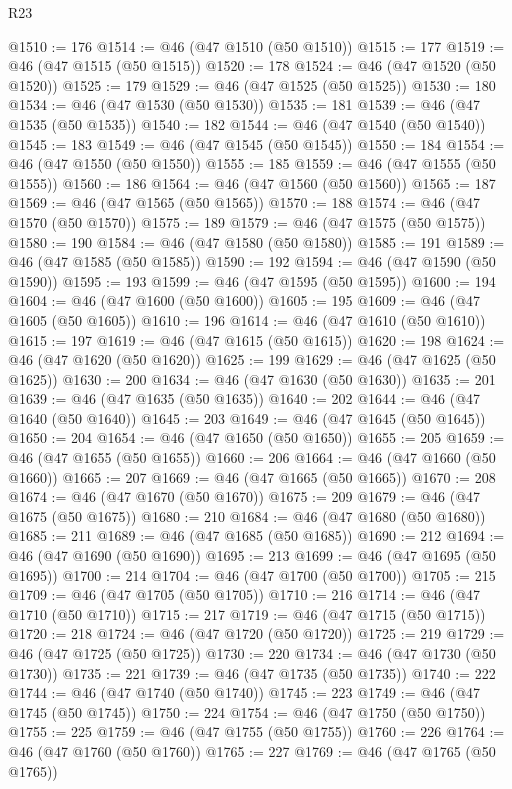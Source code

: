\begin{lexlean}{R23}
\begin{coremodule}
{{{{{{{{{{{{{{{{{{{{{@1510 := 176
@1514 := @46 (@47 @1510 (@50 @1510))
@1515 := 177
@1519 := @46 (@47 @1515 (@50 @1515))
@1520 := 178
@1524 := @46 (@47 @1520 (@50 @1520))
@1525 := 179
@1529 := @46 (@47 @1525 (@50 @1525))
@1530 := 180
@1534 := @46 (@47 @1530 (@50 @1530))
@1535 := 181
@1539 := @46 (@47 @1535 (@50 @1535))
@1540 := 182
@1544 := @46 (@47 @1540 (@50 @1540))
@1545 := 183
@1549 := @46 (@47 @1545 (@50 @1545))
@1550 := 184
@1554 := @46 (@47 @1550 (@50 @1550))
@1555 := 185
@1559 := @46 (@47 @1555 (@50 @1555))
@1560 := 186
@1564 := @46 (@47 @1560 (@50 @1560))
@1565 := 187
@1569 := @46 (@47 @1565 (@50 @1565))
@1570 := 188
@1574 := @46 (@47 @1570 (@50 @1570))
@1575 := 189
@1579 := @46 (@47 @1575 (@50 @1575))
@1580 := 190
@1584 := @46 (@47 @1580 (@50 @1580))
@1585 := 191
@1589 := @46 (@47 @1585 (@50 @1585))
@1590 := 192
@1594 := @46 (@47 @1590 (@50 @1590))
@1595 := 193
@1599 := @46 (@47 @1595 (@50 @1595))
@1600 := 194
@1604 := @46 (@47 @1600 (@50 @1600))
@1605 := 195
@1609 := @46 (@47 @1605 (@50 @1605))
@1610 := 196
@1614 := @46 (@47 @1610 (@50 @1610))
@1615 := 197
@1619 := @46 (@47 @1615 (@50 @1615))
@1620 := 198
@1624 := @46 (@47 @1620 (@50 @1620))
@1625 := 199
@1629 := @46 (@47 @1625 (@50 @1625))
@1630 := 200
@1634 := @46 (@47 @1630 (@50 @1630))
@1635 := 201
@1639 := @46 (@47 @1635 (@50 @1635))
@1640 := 202
@1644 := @46 (@47 @1640 (@50 @1640))
@1645 := 203
@1649 := @46 (@47 @1645 (@50 @1645))
@1650 := 204
@1654 := @46 (@47 @1650 (@50 @1650))
@1655 := 205
@1659 := @46 (@47 @1655 (@50 @1655))
@1660 := 206
@1664 := @46 (@47 @1660 (@50 @1660))
@1665 := 207
@1669 := @46 (@47 @1665 (@50 @1665))
@1670 := 208
@1674 := @46 (@47 @1670 (@50 @1670))
@1675 := 209
@1679 := @46 (@47 @1675 (@50 @1675))
@1680 := 210
@1684 := @46 (@47 @1680 (@50 @1680))
@1685 := 211
@1689 := @46 (@47 @1685 (@50 @1685))
@1690 := 212
@1694 := @46 (@47 @1690 (@50 @1690))
@1695 := 213
@1699 := @46 (@47 @1695 (@50 @1695))
@1700 := 214
@1704 := @46 (@47 @1700 (@50 @1700))
@1705 := 215
@1709 := @46 (@47 @1705 (@50 @1705))
@1710 := 216
@1714 := @46 (@47 @1710 (@50 @1710))
@1715 := 217
@1719 := @46 (@47 @1715 (@50 @1715))
@1720 := 218
@1724 := @46 (@47 @1720 (@50 @1720))
@1725 := 219
@1729 := @46 (@47 @1725 (@50 @1725))
@1730 := 220
@1734 := @46 (@47 @1730 (@50 @1730))
@1735 := 221
@1739 := @46 (@47 @1735 (@50 @1735))
@1740 := 222
@1744 := @46 (@47 @1740 (@50 @1740))
@1745 := 223
@1749 := @46 (@47 @1745 (@50 @1745))
@1750 := 224
@1754 := @46 (@47 @1750 (@50 @1750))
@1755 := 225
@1759 := @46 (@47 @1755 (@50 @1755))
@1760 := 226
@1764 := @46 (@47 @1760 (@50 @1760))
@1765 := 227
@1769 := @46 (@47 @1765 (@50 @1765))
}}}}}}}}}}}}}}}}}}}}}
\end{coremodule}
\end{lexlean}
